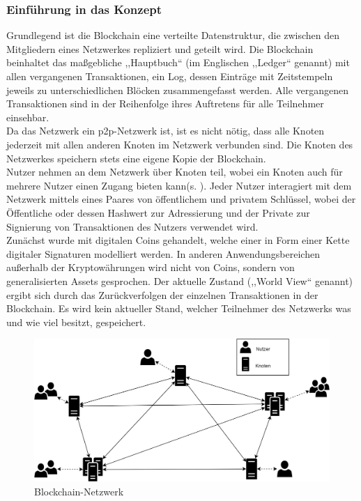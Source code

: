     \subsubsection{Einführung in das Konzept}
    \label{sec:sota_blockchain_introduction}
    Grundlegend ist die Blockchain eine verteilte Datenstruktur, die zwischen den Mitgliedern eines Netzwerkes repliziert und geteilt wird\cite{Christidis2016}.
    Die Blockchain beinhaltet das maßgebliche ,,Hauptbuch`` (im Englischen ,,Ledger`` genannt) mit allen vergangenen Transaktionen, ein Log, dessen Einträge mit Zeitstempeln jeweils zu unterschiedlichen Blöcken zusammengefasst werden. 
    Alle vergangenen Transaktionen sind in der Reihenfolge ihres Auftretens für alle Teilnehmer einsehbar\cite{Nakamoto2008}.
    \medskip\\
    Da das Netzwerk ein \gls{p2p}-Netzwerk ist, ist es nicht nötig, dass alle Knoten jederzeit mit allen anderen Knoten im Netzwerk verbunden sind. 
    Die Knoten des Netzwerkes speichern stets eine eigene Kopie der Blockchain.
    \medskip\\
    Nutzer nehmen an dem Netzwerk über Knoten teil, wobei ein Knoten auch für mehrere Nutzer einen Zugang bieten kann(s. ). 
    Jeder Nutzer interagiert mit dem Netzwerk mittels eines Paares von öffentlichem und privatem Schlüssel, wobei der Öffentliche oder dessen Hashwert zur Adressierung und der Private zur Signierung von Transaktionen des Nutzers verwendet wird.\cite{Christidis2016}
    \medskip\\
    Zunächst wurde mit digitalen Coins gehandelt, welche einer in Form einer Kette digitaler Signaturen modelliert werden\cite{Nakamoto2008}.
    In anderen Anwendungsbereichen außerhalb der Kryptowährungen wird nicht von Coins, sondern von generalisierten Assets gesprochen.
    Der aktuelle Zustand (,,World View`` genannt) ergibt sich durch das Zurückverfolgen der einzelnen Transaktionen in der Blockchain. 
    Es wird kein aktueller Stand, welcher Teilnehmer des Netzwerks was und wie viel besitzt, gespeichert.\cite{Christidis2016}
    \begin{figure}[H]
    	\centering
    	\includegraphics[width=\textwidth]{graphics/BCNetwork.png}
    	\caption[Blockchain-Netzwerk]{Blockchain-Netzwerk}
    	\label{fig:bc_network}
    \end{figure}
    
